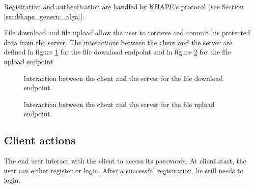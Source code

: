 \documentclass[../report.tex]{subfiles}
\begin{document}
Registration and authentication are handled by KHAPE's protocol (see Section \ref{sec:khape_generic_algo}).

File download and file upload allow the user to retrieve and commit his protected data from the server. The interactions between the client and the server are defined in figure \ref{fig:usecase_download} for the file download endpoint and in figure \ref{fig:usecase_upload} for the file upload endpoint




\begin{figure}[h]
 \centering

 \setlength{\fboxsep}{10pt}
 \setlength{\fboxrule}{1pt}

 \caption{Interaction between the client and the server for the file download endpoint.}
 \label{fig:usecase_download}
\end{figure}


\begin{figure}[h]
 \centering

 \setlength{\fboxsep}{10pt}
 \setlength{\fboxrule}{1pt}

 \caption{Interaction between the client and the server for the file upload endpoint.}
 \label{fig:usecase_upload}
\end{figure}




\subsection{Client actions}
The end user interact with the client to access its passwords.
At client start, the user can either register or login.
After a successful registration, he still needs to login.
\end{document}
